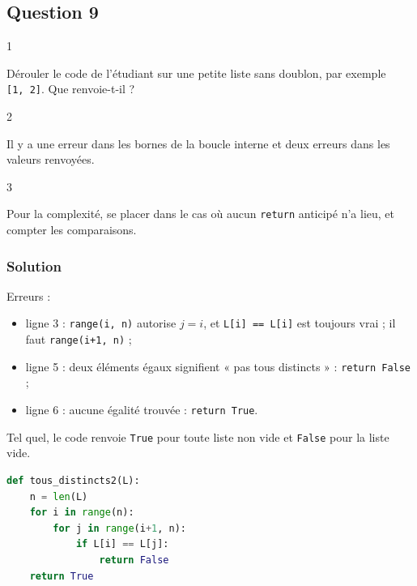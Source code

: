 \documentclass[11pt,a4paper]{article}
\providecommand{\tightlist}{\setlength{\itemsep}{0pt}\setlength{\parskip}{0pt}}
\begin{document}
\hypertarget{question-9}{%
\subsection{Question 9}\label{question-9}}

\begin{indication}{1}

Dérouler le code de l'étudiant sur une petite liste sans doublon, par exemple \texttt{{[}1,\ 2{]}}. Que renvoie-t-il ?

\end{indication}

\begin{indication}{2}

Il y a une erreur dans les bornes de la boucle interne et deux erreurs dans les valeurs renvoyées.

\end{indication}

\begin{indication}{3}

Pour la complexité, se placer dans le cas où aucun \texttt{return} anticipé n'a lieu, et compter les comparaisons.

\end{indication}

\hypertarget{solution-8}{%
\subsubsection{Solution}\label{solution-8}}

Erreurs :

\begin{itemize}
\tightlist
\item
  ligne 3 : \texttt{range(i,\ n)} autorise \(j = i\), et \texttt{L{[}i{]}\ ==\ L{[}i{]}} est toujours vrai ; il faut \texttt{range(i+1,\ n)} ;
\item
  ligne 5 : deux éléments égaux signifient « pas tous distincts » : \texttt{return\ False} ;
\item
  ligne 6 : aucune égalité trouvée : \texttt{return\ True}.
\end{itemize}

Tel quel, le code renvoie \texttt{True} pour toute liste non vide et \texttt{False} pour la liste vide.

\begin{lstlisting}[language=Python]
def tous_distincts2(L):
    n = len(L)
    for i in range(n):
        for j in range(i+1, n):
            if L[i] == L[j]:
                return False
    return True
\end{lstlisting}
\end{document}
